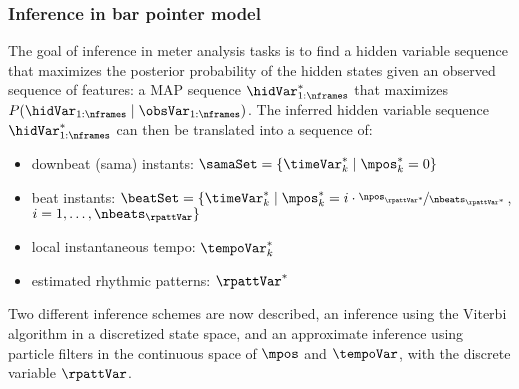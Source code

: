 \subsubsection{Inference in bar pointer model}
The goal of inference in meter analysis tasks is to find a hidden variable sequence that maximizes the posterior probability of the hidden states given an observed sequence of features: a \gls{MAP} sequence $\hidVar^{\optstar}_{1:\nframes}$ that maximizes $P(\hidVar_{1:\nframes} \mid \obsVar_{1:\nframes})$. The inferred hidden variable sequence $\hidVar^{\optstar}_{1:\nframes}$ can then be translated into a sequence of: 
\begin{itemize}[noitemsep]
	\item downbeat (\gls{sama}) instants: $\samaSet = \{\timeVar^{\optstar}_k \mid \mpos^{\optstar}_k = 0\}$
	\item beat instants: $\beatSet = \{\timeVar^{\optstar}_k \mid \mpos^{\optstar}_k = i \cdot \nicefrac{\npos_{\rpattVar^\optstar}}{\nbeats_{\rpattVar^\optstar}}$, $i = 1,\ldots,\nbeats_\rpattVar \}$
	\item local instantaneous tempo: $\tempoVar^{\optstar}_k$
	\item estimated rhythmic patterns: $\rpattVar^{\optstar}$
\end{itemize}
Two different inference schemes are now described, an inference using the Viterbi algorithm in a discretized state space, and an approximate inference using particle filters in the continuous space of $\mpos$ and $\tempoVar$, with the discrete variable $\rpattVar$. 
